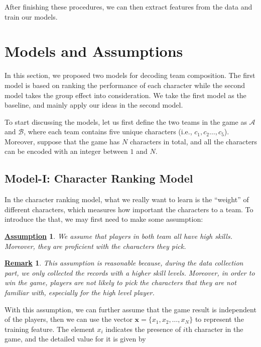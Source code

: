 \documentclass{article} %
\newtheorem{assumption}{\underline{Assumption}}
\newtheorem{remark}{\underline{Remark}}
\begin{document}
After finishing these procedures, we can then extract features from the data and train our models.






\section{Models and Assumptions}

In this section, we proposed two models for decoding team composition. The first model is based on ranking the performance of each character while the second model takes the group effect into consideration. We take the first model as the baseline, and mainly apply our ideas in the second model.


To start discussing the models,  let us first define the two teams in the game as $\mathcal{A}$ and $\mathcal{B}$, where each team contains five unique characters (i.e., $c_1,c_2\ldots,c_5$). Moreover, suppose that the game has $N$ characters in total, and all the characters can be encoded with an integer between $1$ and $N$.

\subsection{Model-I: Character Ranking Model}

In the character ranking model, what we really want to learn is the ``weight'' of different characters, which measures how important the characters to a team. To introduce the that, we may first need to make some assumption:

\begin{assumption}
We assume that players in both team all have high skills. Moreover, they are proficient with the characters they pick.
\end{assumption}

\begin{remark}
This assumption is reasonable because, during the data collection part, we only collected the records with a higher skill levels. Moreover, in order to win the game, players are not likely to pick the characters that they are not familiar with, especially for the high level player.
\end{remark}

With this assumption, we can further assume that the game result is independent of the players, then we can use the vector $\textbf{x}=\{x_1,x_2,\ldots,x_N\}$ to represent the training feature. The element $x_i$ indicates the presence of $i$th character in the game, and the detailed value for it is given by
\end{document}
